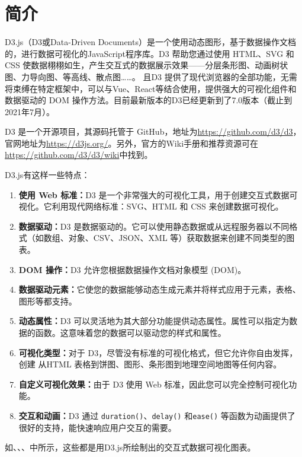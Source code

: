 \section{简介}

D3.js（D3或Data-Driven Documents）是一个使用动态图形，基于数据操作文档的，进行数据可视化的JavaScript程序库。D3 帮助您通过使用 HTML、SVG 和 CSS 使数据栩栩如生，产生交互式的数据展示效果——分层条形图、动画树状图、力导向图、等高线、散点图……。 且D3 提供了现代浏览器的全部功能，无需将束缚在特定框架中，可以与Vue、React等结合使用，提供强大的可视化组件和数据驱动的 DOM 操作方法。目前最新版本的D3已经更新到了7.0版本（截止到2021年7月）。

D3 是一个开源项目，其源码托管于 GitHub，地址为\url{https://github.com/d3/d3}，官网地址为\url{https://d3js.org/}。另外，官方的Wiki手册和推荐资源可在\url{https://github.com/d3/d3/wiki}中找到。

D3.js有这样一些特点：

\begin{enumerate}
    \item \textbf{使用 Web 标准：}D3 是一个非常强大的可视化工具，用于创建交互式数据可视化。它利用现代网络标准：SVG、HTML 和 CSS 来创建数据可视化。
    \item \textbf{数据驱动：}D3 是数据驱动的。它可以使用静态数据或从远程服务器以不同格式（如数组、对象、CSV、JSON、XML 等）获取数据来创建不同类型的图表。
    \item \textbf{DOM 操作：}D3 允许您根据数据操作文档对象模型 (DOM)。
    \item \textbf{数据驱动元素：}它使您的数据能够动态生成元素并将样式应用于元素，表格、图形等都支持。
    \item \textbf{动态属性：}D3 可以灵活地为其大部分功能提供动态属性。属性可以指定为数据的函数。这意味着您的数据可以驱动您的样式和属性。
    \item \textbf{可视化类型：}对于 D3，尽管没有标准的可视化格式，但它允许你自由发挥，创建 从HTML 表格到饼图、图形、条形图到地理空间地图等任何内容。
    \item \textbf{自定义可视化效果：}由于 D3 使用 Web 标准，因此您可以完全控制可视化功能。
    \item \textbf{交互和动画：}D3 通过 \verb|duration()|、\verb|delay()| 和\verb|ease()| 等函数为动画提供了很好的支持，能快速响应用户交互的需要。 
\end{enumerate}

如、、、中所示，这些都是用D3.js所绘制出的交互式数据可视化图表。

